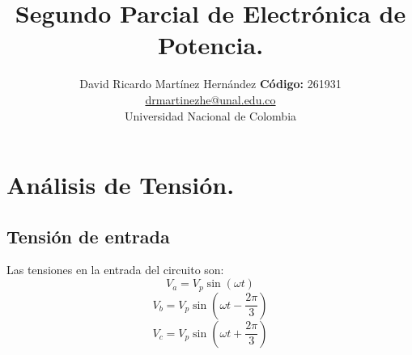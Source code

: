 \documentclass[12pt,graphicx,caption,rotating]{article}
\begin{document}
\title{\textbf{\huge{Segundo Parcial de Electrónica de Potencia.}}}
\author{David Ricardo Martínez Hernández \textbf{Código:} 261931\\
	\href{}{drmartinezhe@unal.edu.co}\\
	Universidad Nacional de Colombia}
\date{}
\maketitle

\section{Análisis de Tensión.}
\noindent
\subsection{Tensión de entrada}
\noindent
Las tensiones en la entrada del circuito son:
\begin{equation}
 V_a = V_p \sin \left (\omega t \right)
 \label{ecu1}
\end{equation}
\begin{equation}
 V_b = V_p \sin \left (\omega t - \frac{2 \pi}{3}\right)
 \label{ecu2}
\end{equation}
\begin{equation}
 V_c = V_p \sin \left (\omega t+ \frac{2 \pi}{3}\right )
 \label{ecu3}
\end{equation}
\end{document}
